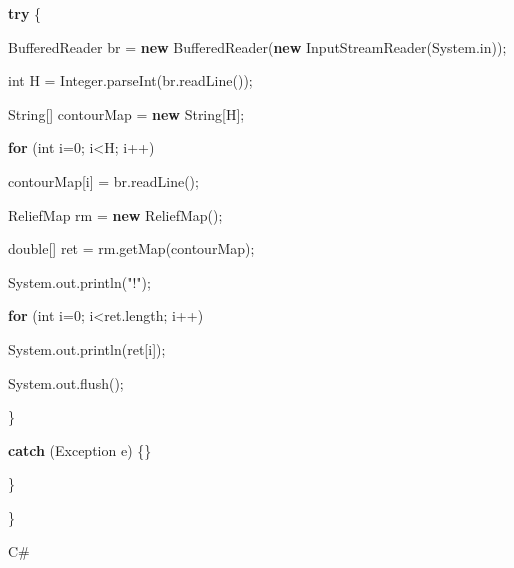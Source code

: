 \documentclass[]{article}
\newenvironment{Shaded}{}{}
\newcommand{\BuiltInTok}[1]{#1}
\newcommand{\DataTypeTok}[1]{\textcolor[rgb]{0.56,0.13,0.00}{#1}}
\newcommand{\DecValTok}[1]{\textcolor[rgb]{0.25,0.63,0.44}{#1}}
\newcommand{\FunctionTok}[1]{\textcolor[rgb]{0.02,0.16,0.49}{#1}}
\newcommand{\KeywordTok}[1]{\textcolor[rgb]{0.00,0.44,0.13}{\textbf{#1}}}
\newcommand{\NormalTok}[1]{#1}
\newcommand{\StringTok}[1]{\textcolor[rgb]{0.25,0.44,0.63}{#1}}
\begin{document}
\begin{Shaded}
\begin{Highlighting}[]
     \KeywordTok{try}\NormalTok{ \{}

       \BuiltInTok{BufferedReader}\NormalTok{ br = }\KeywordTok{new} \BuiltInTok{BufferedReader}\NormalTok{(}\KeywordTok{new} \BuiltInTok{InputStreamReader}\NormalTok{(}\BuiltInTok{System}\NormalTok{.}\FunctionTok{in}\NormalTok{));}

       \DataTypeTok{int}\NormalTok{ H = }\BuiltInTok{Integer}\NormalTok{.}\FunctionTok{parseInt}\NormalTok{(br.}\FunctionTok{readLine}\NormalTok{());}

       \BuiltInTok{String}\NormalTok{[] contourMap = }\KeywordTok{new} \BuiltInTok{String}\NormalTok{[H];}

       \KeywordTok{for}\NormalTok{ (}\DataTypeTok{int}\NormalTok{ i=}\DecValTok{0}\NormalTok{; i<H; i++)}

\NormalTok{           contourMap[i] = br.}\FunctionTok{readLine}\NormalTok{();}

\NormalTok{       ReliefMap rm = }\KeywordTok{new} \FunctionTok{ReliefMap}\NormalTok{();}

       \DataTypeTok{double}\NormalTok{[] ret = rm.}\FunctionTok{getMap}\NormalTok{(contourMap);}

       \BuiltInTok{System}\NormalTok{.}\FunctionTok{out}\NormalTok{.}\FunctionTok{println}\NormalTok{(}\StringTok{"!"}\NormalTok{);}

       \KeywordTok{for}\NormalTok{ (}\DataTypeTok{int}\NormalTok{ i=}\DecValTok{0}\NormalTok{; i<ret.}\FunctionTok{length}\NormalTok{; i++)}

           \BuiltInTok{System}\NormalTok{.}\FunctionTok{out}\NormalTok{.}\FunctionTok{println}\NormalTok{(ret[i]);}

       \BuiltInTok{System}\NormalTok{.}\FunctionTok{out}\NormalTok{.}\FunctionTok{flush}\NormalTok{();}

\NormalTok{     \}}

     \KeywordTok{catch}\NormalTok{ (}\BuiltInTok{Exception}\NormalTok{ e) \{\}}

\NormalTok{   \}}

\NormalTok{\}}
\end{Highlighting}
\end{Shaded}

C\#
\end{document}
